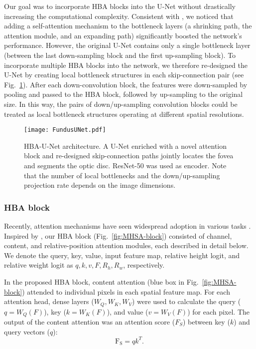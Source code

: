 \documentclass[hidelinks,runningheads]{llncs}
\begin{document}
Our goal was to incorporate \ac{HBA} blocks into the U-Net without drastically increasing the computational complexity.
Consistent with \cite{srinivas_bottleneck_2021}, we noticed that adding a self-attention mechanism to the bottleneck layers (a shrinking path, the attention module, and an expanding path) significantly boosted the network's performance.
However, the original U-Net contains only a single bottleneck layer (between the last down-sampling block and the first up-sampling block).
To incorporate multiple HBA blocks into the network, we therefore re-designed the U-Net by creating local bottleneck structures in each skip-connection pair (see Fig.~\ref{fig:architecture}).
After each down-convolution block, the features were down-sampled by pooling and passed to the HBA block, followed by up-sampling to the original size. In this way, the pairs of down/up-sampling convolution blocks could be treated as local bottleneck structures operating at different spatial resolutions. 

\begin{figure}[!t]
    \centering
    \texttt{[image: FundusUNet.pdf]}
    \caption{HBA-U-Net architecture. A U-Net enriched with a novel attention block and re-designed skip-connection paths jointly locates the fovea and segments the optic disc. ResNet-50 was used as encoder. Note that the number of local bottlenecks and the down/up-sampling projection rate depends on the image dimensions. }
    \label{fig:architecture}
\end{figure}


\subsubsection{HBA block}



Recently, attention mechanisms have seen widespread adoption in various tasks \cite{vaswani_attention_2017}. 
Inspired by \cite{srinivas_bottleneck_2021,DBLP:journals/corr/abs-1807-06521}, our \ac{HBA} block (Fig.~\ref{fig:MHSA-block}) consisted of channel, content, and relative-position attention modules, each described in detail below. We denote the query, key, value, input feature map, relative height logit, and relative weight logit as $q, k, v, F, R_h, R_w$, respectively. 

In the proposed \ac{HBA} block, content attention (blue box in Fig.~\ref{fig:MHSA-block}) attended to individual pixels in each spatial feature map. For each attention head, dense layers ($W_Q, W_K, W_V$) were used to calculate the query ($q = W_Q(F)$), key ($k = W_K(F)$), and value ($v = W_V(F)$) for each pixel. The output of the content attention was an attention score ($F_S$) between key ($k$) and query vectors ($q$):
\begin{equation} \label{eq:content}
    \mathrm{F_S} = qk^T.
\end{equation}
\end{document}
